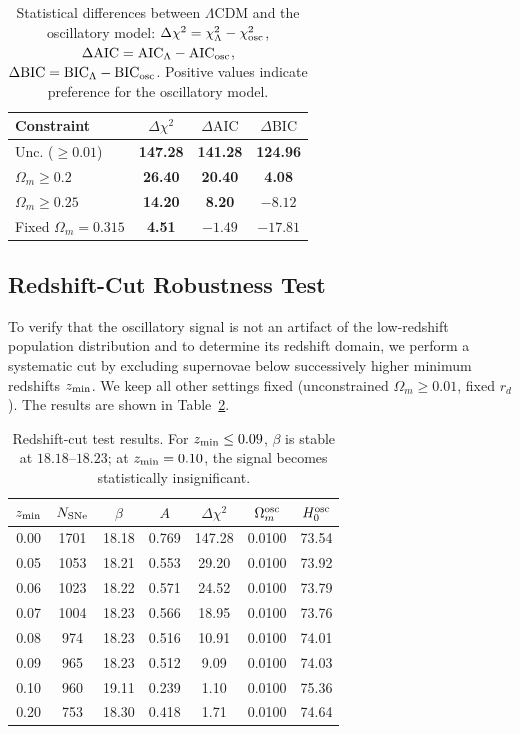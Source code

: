 \documentclass[10pt,a4paper]{article}
\begin{document}
\begin{table}[ht]
\centering
\setlength{\tabcolsep}{10pt}
\caption{\label{tab:fit_delta}Statistical differences between $\Lambda$CDM and the oscillatory model:
$\Delta\chi^2 = \chi^2_\Lambda - \chi^2_{\rm osc}$,
$\Delta\text{AIC} = \text{AIC}_\Lambda - \text{AIC}_{\rm osc}$,
$\Delta\text{BIC} = \text{BIC}_\Lambda - \text{BIC}_{\rm osc}$.
Positive values indicate preference for the oscillatory model.}
\begin{tabular}{lccc}
\toprule
Constraint & $\Delta\chi^2$ & $\Delta\text{AIC}$ & $\Delta\text{BIC}$ \\
\midrule
Unc. ($\ge0.01$)      & \textbf{147.28} & \textbf{141.28} & \textbf{124.96} \\
$\Omega_m\ge0.2$       & \textbf{26.40}  & \textbf{20.40}  & \textbf{4.08}   \\
$\Omega_m\ge0.25$      & \textbf{14.20}  & \textbf{8.20}   & $-8.12$         \\
Fixed $\Omega_m=0.315$ & \textbf{4.51}   & $-1.49$         & $-17.81$        \\
\bottomrule
\end{tabular}
\end{table}

\subsection{Redshift-Cut Robustness Test}
To verify that the oscillatory signal is not an artifact of the low-redshift population distribution and to determine its redshift domain, we perform a systematic cut by excluding supernovae below successively higher minimum redshifts $z_{\rm min}$. We keep all other settings fixed (unconstrained $\Omega_m\ge0.01$, fixed $r_d$). The results are shown in Table~\ref{tab:cut}.

\begin{table}[ht]
\centering
\setlength{\tabcolsep}{5pt}
\caption{\label{tab:cut}Redshift-cut test results. For $z_{\rm min}\le0.09$, $\beta$ is stable at $18.18$–$18.23$; at $z_{\rm min}=0.10$, the signal becomes statistically insignificant.}
\begin{tabular}{ccccccc}
\toprule
$z_{\rm min}$ & $N_{\rm SNe}$ & $\beta$ & $A$ & $\Delta\chi^2$ & $\Omega_m^{\rm osc}$ & $H_0^{\rm osc}$ \\
\midrule
0.00 & 1701 & 18.18 & 0.769 & 147.28 & 0.0100 & 73.54 \\
0.05 & 1053 & 18.21 & 0.553 & 29.20 & 0.0100 & 73.92 \\
0.06 & 1023 & 18.22 & 0.571 & 24.52 & 0.0100 & 73.79 \\
0.07 & 1004 & 18.23 & 0.566 & 18.95 & 0.0100 & 73.76 \\
0.08 & 974  & 18.23 & 0.516 & 10.91 & 0.0100 & 74.01 \\
0.09 & 965  & 18.23 & 0.512 &  9.09 & 0.0100 & 74.03 \\
0.10 & 960  & 19.11 & 0.239 &  1.10 & 0.0100 & 75.36 \\
0.20 & 753  & 18.30 & 0.418 &  1.71 & 0.0100 & 74.64 \\
\bottomrule
\end{tabular}
\end{table}
\end{document}

